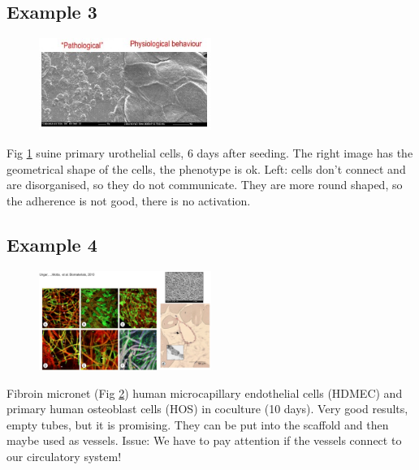 \subsection{Example 3}
\begin{figure}[h]
\centering
\includegraphics[width=0.5\textwidth]{suine.jpg}
\caption{\label{fig:suine}}
\end{figure}
Fig \ref{fig:suine} suine primary urothelial cells, 6 days after seeding. 
The right image has the geometrical shape of the cells, the phenotype is ok. 
Left: cells don’t connect and are disorganised, so they do not communicate. 
They are more round shaped, so the adherence is not good, there is no activation.

\subsection{Example 4}
\begin{figure}[h]
\centering
\includegraphics[width=0.5\textwidth]{fibroin}
\caption{\label{fig:fibroin}}
\end{figure}
Fibroin micronet (Fig \ref{fig:fibroin}) human microcapillary endothelial cells (HDMEC) and primary human osteoblast cells (HOS) in coculture (10 days). Very good results, empty tubes, but it is promising. They can be put into the scaffold and then maybe used as vessels. Issue: We have to pay attention if the vessels connect to our circulatory system!

